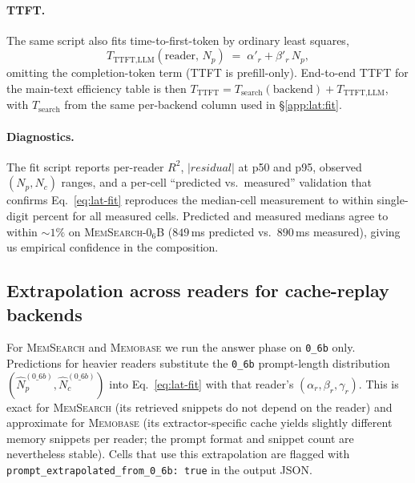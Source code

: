 \paragraph{TTFT.} The same script also fits time-to-first-token by
ordinary least squares,
\begin{equation}
T_{\text{TTFT,LLM}}(\text{reader},\, N_p) \;=\; \alpha'_r + \beta'_r\, N_p,
\label{eq:lat-fit-ttft}
\end{equation}
omitting the completion-token term (TTFT is prefill-only). End-to-end
TTFT for the main-text efficiency table is then
$T_{\text{TTFT}} = T_{\text{search}}(\text{backend}) + T_{\text{TTFT,LLM}}$,
with $T_{\text{search}}$ from the same per-backend column used in
\S\ref{app:lat:fit}.

\paragraph{Diagnostics.} The fit script reports per-reader $R^2$,
$|residual|$ at p50 and p95, observed $(N_p, N_c)$ ranges, and a
per-cell ``predicted vs.\ measured'' validation that confirms
Eq.~\ref{eq:lat-fit} reproduces the median-cell measurement to within
single-digit percent for all measured cells. Predicted and measured
medians agree to within $\sim\!1\%$ on \textsc{MemSearch}-$0_6$B
($849$\,ms predicted vs.\ $890$\,ms measured), giving us empirical
confidence in the composition.

\subsection{Extrapolation across readers for cache-replay backends}
\label{app:lat:extrapolation}

For \textsc{MemSearch} and \textsc{Memobase} we run the answer phase on
\texttt{0\_6b} only. Predictions for heavier readers substitute the
\texttt{0\_6b} prompt-length distribution
$(\widehat{N}_p^{(0\_6b)}, \widehat{N}_c^{(0\_6b)})$ into
Eq.~\ref{eq:lat-fit} with that reader's $(\alpha_r,\beta_r,\gamma_r)$.
This is exact for \textsc{MemSearch} (its retrieved snippets do not
depend on the reader) and approximate for \textsc{Memobase} (its
extractor-specific cache yields slightly different memory snippets per
reader; the prompt format and snippet count are nevertheless stable).
Cells that use this extrapolation are flagged with
\texttt{prompt\_extrapolated\_from\_0\_6b: true} in the output JSON.

